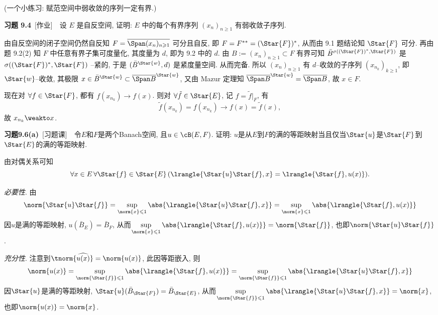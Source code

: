 	(一个小练习: 赋范空间中弱收敛的序列一定有界.)

	\textbf{习题 9.4}\ [作业]\ \ 设 $ E $ 是自反空间, 证明: $ E $ 中的每个有界序列 $ (x_{n})_{n\geqslant1} $ 有弱收敛子序列.
	\begin{answer}
		由自反空间的闭子空间仍然自反知 $ F=\overline{\Span(x_{n})_{n\geqslant1}} $ 可分且自反, 即 $ F=F^{**}=(\Star{F})^{*} $, 从而由 9.1 题结论知 $ \Star{F} $ 可分. 再由题 9.2(2) 知 $ F $ 中任意有界子集可度量化, 其度量为 $ d $, 即为 9.2 中的 $ d $. 由 $ B:=(x_{n})_{n\geqslant1}\subset F $ 有界可知 $ \bar{B}^{\sigma((\Star{F})^{*}, \Star{F})} $ 是 $ \sigma((\Star{F})^{*}, \Star{F}) $ --紧的, 于是 $ (\bar{B}^{\Star{w}}, d) $ 是紧度量空间. 从而完备. 所以 $ (x_{n})_{n\geqslant1} $ 有 $ d $--收敛的子序列 $ (x_{n_{k}})_{k\geqslant1} $, 即 $ \Star{w} $--收敛, 其极限 $ x\in\bar{B}^{\Star{w}}\subset\overline{\Span B}^{\Star{w}} $, 又由 Mazur 定理知 $ \overline{\Span B}^{\Star{w}}=\overline{\Span B} $, 故 $ x\in F $.

		现在对 $ \forall f\in\Star{F} $, 都有 $  f(x_{n_{k}})\to f(x) $. 则对 $ \forall \tilde{f}\in\Star{E} $, 记 $ f = \tilde{f}|_{F} $, 有
		\[
			\tilde{f}(x_{n_{k}})=f(x_{n_{k}})\to f(x)=\tilde{f}(x),
		\]
		故 $ x_{n_{k}}\weakto x $.\qedhere
	\end{answer}
	
	\textbf{习题9.6(a)}\ [习题课]\ \ 令$ E $和$ F $是两个Banach空间, 且$ u\in\cB(E,F) $. 证明: $ u $是从$ E $到$ F $的满的等距映射当且仅当$ \Star{u} $是$ \Star{F} $到$ \Star{E} $的满的等距映射.
	\begin{answer}
	由对偶关系可知
	\[
	\forall x\in E\,\forall\Star{f}\in\Star{E}\,(\lrangle{\Star{u}\Star{f},x}=\lrangle{\Star{f},u(x)}).
	\]
	
	\textsl{必要性}. 由
	\[
	\norm{\Star{u}\Star{f}}=\sup_{\norm{x}\leqslant 1}\abs{\lrangle{\Star{u}\Star{f},x}}=\sup_{\norm{x}\leqslant 1}\abs{\lrangle{\Star{f},u(x)}}
	\]
	因$ u $是满的等距映射, $ u(\bar{B}_E)=\bar{B}_F $, 从而$ \sup\limits_{\norm{x}\leqslant 1}\abs{\lrangle{\Star{f},u(x)}}=\norm{\Star{f}} $, 也即$ \norm{\Star{u}\Star{f}} $.
	
	\textsl{充分性}. 注意到$ \tnorm{\widehat{u(x)}}=\norm{u(x)} $, 此因等距嵌入, 则
	\[
	\norm{u(x)}=\sup_{\norm{\Star{f}}\leqslant 1}\abs{\lrangle{\Star{f},u(x)}}=\sup_{\norm{\Star{f}}\leqslant 1}\abs{\lrangle{\Star{u}\Star{f},x}}
	\]
	因$ \Star{u} $是满的等距映射, $ \Star{u}(\bar{B}_{\Star{F}})=\bar{B}_{\Star{E}} $, 从而$ \sup\limits_{\norm{\Star{f}}\leqslant 1}\abs{\lrangle{\Star{u}\Star{f},x}}=\norm{x} $, 也即$ \norm{u(x)}=\norm{x} $.\qedhere
	\end{answer}
	
